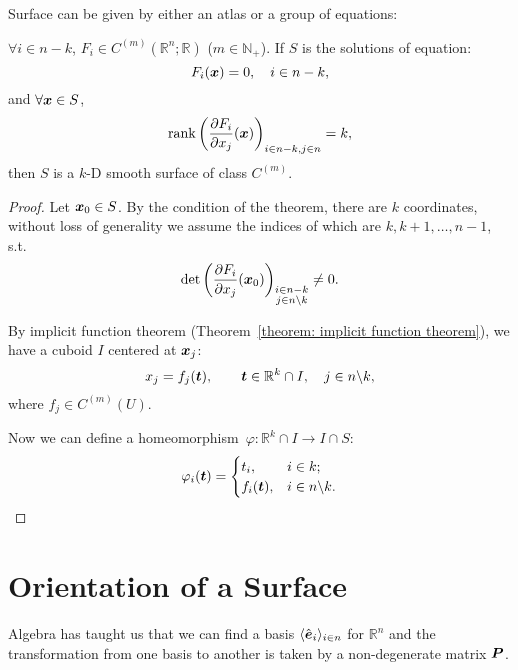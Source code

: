 \documentclass[openany]{book}
\DeclareMathOperator{\rank}{rank}
\begin{document}
Surface can be given by either an atlas or a group of equations:
\begin{theorem}
	$\forall i \in n-k$, $F_i \in C^{(m)}(\mathbb R^n; \mathbb R)$ ($m \in \mathbb N_+$). 
	If $S$ is the solutions of equation: 
	\begin{equation}
		\label{equation: surface given by equation}
		F_i(\boldsymbol{x}) = 0, \quad i \in n-k,
	\end{equation}
	and $\forall \boldsymbol{x} \in S$,
	\begin{equation*}
		\rank \left(
			\pdiff{F_i}{x_j}(\bv x)
		\right)_{i \in n-k, j \in n} = k,
	\end{equation*}
	then $S$ is a $k$-D smooth surface of class $C^{(m)}$.
\end{theorem}
\begin{proof}
	Let $\boldsymbol{x}_0 \in S$. By the condition of the theorem, there are $k$ coordinates, without loss of generality we assume the indices of which are $k, k+1, \ldots, n-1$, s.t.\ 
	\begin{equation*}
		\det \left(
			\pdiff{F_i}{x_j}(\bv x_0)
		\right)_{\substack{i \in n - k \\ j \in n \backslash k}} \neq 0.
	\end{equation*}

	By implicit function theorem (Theorem~\ref{theorem: implicit function theorem}), we have a cuboid $I$ centered at $\boldsymbol{x}_j$:
	\begin{equation*}
		x_j = f_j(\boldsymbol{t}), \qquad \boldsymbol{t} \in \mathbb R^{k} \cap I, \quad j \in n \backslash k,
	\end{equation*}
	where $f_j \in C^{(m)}(U)$.

	Now we can define a homeomorphism~$\varphi \colon \mathbb R^{k} \cap I \to I \cap S$:
	\begin{equation*}
		\varphi_i(\boldsymbol{t}) = 
		\begin{cases}
			t_i, & i \in k; \\
			f_i(\boldsymbol{t}), & i \in n \backslash k.
		\end{cases}
	\end{equation*}
\end{proof}

\section{Orientation of a Surface}

Algebra has taught us that we can find a basis $\langle \hat{\boldsymbol{e}}_i\rangle_{i \in n}$ for $\mathbb R^n$ and the transformation from one basis to another is taken by a non-degenerate matrix $\boldsymbol{P}$. 
\end{document}
